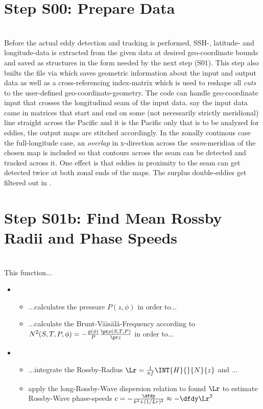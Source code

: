 \section{Step S00: Prepare Data}
	\\
Before the actual eddy detection and tracking is performed,  SSH-, latitude- and longitude-data is extracted from the given data at desired geo-coordinate bounds and saved as structures in the form needed by the next step (S01). This step also builts the file  via  which saves geometric information about the input and output data as well as a cross-referencing index-matrix which is used to reshape all \textit{cuts} to the user-defined geo-coordinate-geometry. The code can handle geo-coordinate input that crosses the longitudinal seam of
the input data. \Eg say the input data came in matrices that start and end on
some (not necessarily strictly meridional) line straight across the Pacific and
it is the Pacific only that is to be analyzed for eddies, the output maps are
stitched accordingly. In the zonally continous case \ie the full-longitude case, an \textit{overlap} in x-direction across the \textit{seam}-meridian of the chosen map is included so that contours across the seam can be detected and tracked across it. One effect is that eddies in proximity to the seam can get detected twice at both zonal ends of the maps. The surplus double-eddies get filtered out in .
\section{Step S01b: Find Mean Rossby Radii and Phase Speeds}
\\

This function...
\begin{itemize}
	\item
	\begin{itemize}
		\item
		...calculates the pressure $P(z,\phi)$ in order to...
		\item
		...calculate the Brunt-V\"ais\"al\"a-Frequency according to $N^{2}(S,T,P,\phi)=-\frac{g(\phi)}{P} \frac{\pr \rho(S,T,P)}{\pr z}$
		in order to...
	\end{itemize}
	\item
	\begin{itemize}
		\item
		...integrate the Rossby-Radius $\Lr=\frac{1}{\pi f}\INT{H}{ }{N}{z}$ and ...
		\item
		apply the long-Rossby-Wave dispersion relation to found $\Lr$ to estimate Rossby-Wave phase-speeds $c=-\frac{\dfdy}{k^2+(1/Lr)^2} \approx -\dfdy \Lr^2$
	\end{itemize}
\end{itemize}

